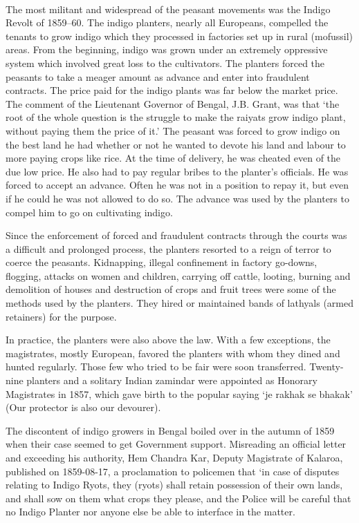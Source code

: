\begin{multicols}{2}
\paragraph*{}
The most militant and widespread of the peasant movements was the Indigo Revolt of 1859--60. The indigo planters, nearly all Europeans, compelled the tenants to grow indigo which they processed in factories set up in rural (mofussil) areas. From the beginning, indigo was grown under an extremely oppressive system which involved great loss to the cultivators. The planters forced the peasants to take a meager amount as advance and enter into fraudulent contracts. The price paid for the indigo plants was far below the market price. The comment of the Lieutenant Governor of Bengal, J.B. Grant, was that `the root of the whole question is the struggle to make the raiyats grow indigo plant, without paying them the price of it.' The peasant was forced to grow indigo on the best land he had whether or not he wanted to devote his land and labour to more paying crops like rice. At the time of delivery, he was cheated even of the due low price. He also had to pay regular bribes to the planter's officials. He was forced to accept an advance. Often he was not in a position to repay it, but even if he could he was not allowed to do so. The advance was used by the planters to compel him to go on cultivating indigo.

Since the enforcement of forced and fraudulent contracts through the courts was a difficult and prolonged process, the planters resorted to a reign of terror to coerce the peasants. Kidnapping, illegal confinement in factory go-downs, flogging, attacks on women and children, carrying off cattle, looting, burning and demolition of houses and destruction of crops and fruit trees were some of the methods used by the planters. They hired or maintained bands of lathyals (armed retainers) for the purpose.

In practice, the planters were also above the law. With a few exceptions, the magistrates, mostly European, favored the planters with whom they dined and hunted regularly. Those few who tried to be fair were soon transferred. Twenty-nine planters and a solitary Indian zamindar were appointed as Honorary Magistrates in 1857, which gave birth to the popular saying `je rakhak se bhakak' (Our protector is also our devourer).

The discontent of indigo growers in Bengal boiled over in the autumn of 1859 when their case seemed to get Government support. Misreading an official letter and exceeding his authority, Hem Chandra Kar, Deputy Magistrate of Kalaroa, published on 1859-08-17, a proclamation to policemen that `in case of disputes relating to Indigo Ryots, they (ryots) shall retain possession of their own lands, and shall sow on them what crops they please, and the Police will be careful that no Indigo Planter nor anyone else be able to interface in the matter.


\end{multicols}

